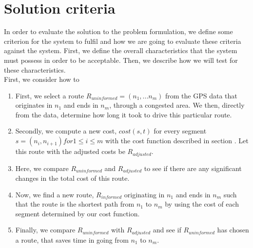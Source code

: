 \section{Solution criteria}
In order to evaluate the solution to the problem formulation, we define some criterion for the system to fulfil and how we are going to evaluate these criteria against the system. First, we define the overall characteristics that the system must possess in order to be acceptable. Then, we describe how we will test for these characteristics.
\\
First, we consider how to 


\begin{enumerate}
\item First, we select a route $R_{uninformed}=(n_1,...n_m)$ from the GPS data that originates in $n_1$ and ends in $n_m$, through a congested area. We then, directly from the data, determine how long it took to drive this particular route.
\item Secondly, we compute a new cost, $cost(s, t)$ for every segment $s=(n_i,n_{i+1}) for 1 \leq i \leq m$ with the cost function described in section . Let this route with the adjusted costs be $R_{adjusted}$.
\item Here, we compare $R_{uninformed}$ and $R_{adjusted}$ to see if there are any significant changes in the total cost of this route.
\item Now, we find a new route, $R_{informed}$ originating in $n_1$ and ends in $n_m$ such that the route is the shortest path from $n_1$ to $n_m$ by using the cost of each segment determined by our cost function.
\item Finally, we compare $R_{uninformed}$ with $R_{adjusted}$ and see if $R_{uninformed}$ has chosen a route, that saves time in going from $n_1$ to $n_m$.
\end{enumerate}